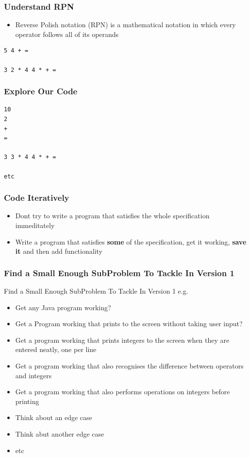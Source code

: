 \documentclass{beamer}
\begin{document}
\begin{frame}[fragile]
\frametitle{Understand RPN}
\begin{itemize}
\item Reverse Polish notation (RPN) is a mathematical notation in which every operator follows all of its operands
\end{itemize}
\begin{block}{}
\begin{lstlisting}
5 4 + =

3 2 * 4 4 * + =
\end{lstlisting}
\end{block}
\end{frame}

\begin{frame}[fragile]
\frametitle{Explore Our Code}
\begin{block}{}
\begin{lstlisting}
10 
2
+ 
=

3 3 * 4 4 * + =

etc
\end{lstlisting}
\end{block}
\end{frame}

\begin{frame}
\frametitle{Code Iteratively}
\begin{itemize}
\item Dont try to write a program that satisfies the whole specification immeditately
\item Write a program that satisfies \textbf{some} of the specification, get it working, \textbf{save it} and then add functionality
\end{itemize}
\end{frame}


\begin{frame}
\frametitle{Find a Small Enough SubProblem To Tackle In Version 1}
Find a Small Enough SubProblem To Tackle In Version 1 e.g.
\begin{itemize}
\item Get any Java program working?
\item Get a Program working that prints to the screen without taking user input?
\item Get a program working that prints integers to the screen when they are entered neatly, one per line
\item Get a program working that also recognises the difference between operators and integers
\item Get a program working that also performs operations on integers before printing
\item Think about an edge case
\item Think abut another edge case
\item etc
\end{itemize}
\end{frame}
\end{document}
